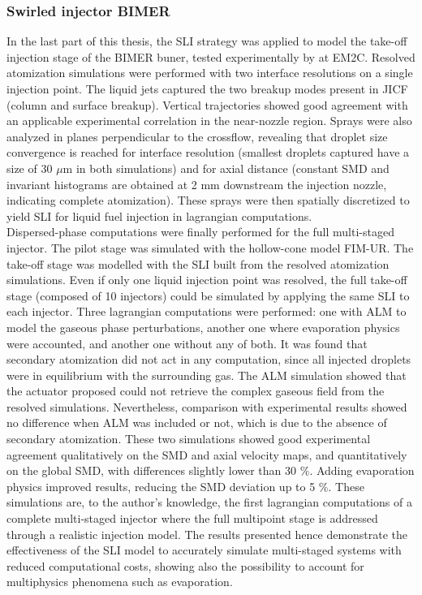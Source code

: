 \subsubsection*{Swirled injector BIMER}

In the last part of this thesis, the SLI strategy was applied to model the take-off injection stage of the BIMER buner, tested experimentally by  at EM2C. Resolved atomization simulations were performed with two interface resolutions on a single injection point. The liquid jets captured the two breakup modes present in JICF (column and surface breakup). Vertical trajectories showed good agreement with an applicable experimental correlation in the near-nozzle region. Sprays were also analyzed in planes perpendicular to the crossflow, revealing that droplet size convergence is reached for interface resolution (smallest droplets captured have a size of 30 $\mu$m in both simulations) and for axial distance (constant SMD and invariant histograms are obtained at 2 mm downstream the injection nozzle, indicating complete atomization). These sprays were then spatially discretized to yield SLI for liquid fuel injection in lagrangian computations. \\

Dispersed-phase computations were finally performed for the full multi-staged injector. The pilot stage was simulated with the hollow-cone model FIM-UR. The take-off stage was modelled with the SLI built from the resolved atomization simulations. Even if only one liquid injection point was resolved, the full take-off stage (composed of 10 injectors) could be simulated by applying the same SLI to each injector. Three lagrangian computations were performed: one with ALM to model the gaseous phase perturbations, another one where evaporation physics were accounted, and another one without any of both. It was found that secondary atomization did not act in any computation, since all injected droplets were in equilibrium with the surrounding gas. The ALM simulation showed that the actuator proposed could not retrieve the complex gaseous field from the resolved simulations. Nevertheless, comparison with experimental results showed no difference when ALM was included or not, which is due to the absence of secondary atomization. These two simulations showed good experimental agreement qualitatively on the SMD and axial velocity maps, and quantitatively on the global SMD, with differences slightly lower than 30 $\%$. Adding evaporation physics improved results, reducing the SMD deviation up to 5 $\%$. These simulations are, to the author's knowledge, the first lagrangian computations of a complete multi-staged injector where the full multipoint stage is addressed through a realistic 
injection model. The results presented hence demonstrate the effectiveness of the SLI model to accurately simulate multi-staged systems with reduced computational costs, showing also the possibility to account for multiphysics phenomena such as evaporation.

